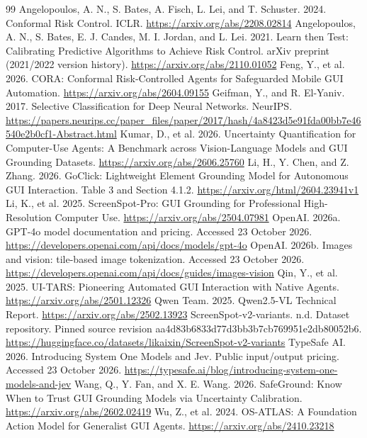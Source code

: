 \documentclass[10pt]{article}
\begin{document}
\begin{thebibliography}{99}
 Angelopoulos, A. N., S. Bates, A. Fisch, L. Lei, and T. Schuster. 2024. Conformal Risk Control. ICLR. \url{https://arxiv.org/abs/2208.02814}
 Angelopoulos, A. N., S. Bates, E. J. Candes, M. I. Jordan, and L. Lei. 2021. Learn then Test: Calibrating Predictive Algorithms to Achieve Risk Control. arXiv preprint (2021/2022 version history). \url{https://arxiv.org/abs/2110.01052}
 Feng, Y., et al. 2026. CORA: Conformal Risk-Controlled Agents for Safeguarded Mobile GUI Automation. \url{https://arxiv.org/abs/2604.09155}
 Geifman, Y., and R. El-Yaniv. 2017. Selective Classification for Deep Neural Networks. NeurIPS. \url{https://papers.neurips.cc/paper_files/paper/2017/hash/4a8423d5e91fda00bb7e46540e2b0cf1-Abstract.html}
 Kumar, D., et al. 2026. Uncertainty Quantification for Computer-Use Agents: A Benchmark across Vision-Language Models and GUI Grounding Datasets. \url{https://arxiv.org/abs/2606.25760}
 Li, H., Y. Chen, and Z. Zhang. 2026. GoClick: Lightweight Element Grounding Model for Autonomous GUI Interaction. Table 3 and Section 4.1.2. \url{https://arxiv.org/html/2604.23941v1}
 Li, K., et al. 2025. ScreenSpot-Pro: GUI Grounding for Professional High-Resolution Computer Use. \url{https://arxiv.org/abs/2504.07981}
 OpenAI. 2026a. GPT-4o model documentation and pricing. Accessed 23 October 2026. \url{https://developers.openai.com/api/docs/models/gpt-4o}
 OpenAI. 2026b. Images and vision: tile-based image tokenization. Accessed 23 October 2026. \url{https://developers.openai.com/api/docs/guides/images-vision}
 Qin, Y., et al. 2025. UI-TARS: Pioneering Automated GUI Interaction with Native Agents. \url{https://arxiv.org/abs/2501.12326}
 Qwen Team. 2025. Qwen2.5-VL Technical Report. \url{https://arxiv.org/abs/2502.13923}
 ScreenSpot-v2-variants. n.d. Dataset repository. Pinned source revision aa4d83b6833d77d3bb3b7cb769951e2db80052b6. \url{https://huggingface.co/datasets/likaixin/ScreenSpot-v2-variants}
 TypeSafe AI. 2026. Introducing System One Models and Jev. Public input/output pricing. Accessed 23 October 2026. \url{https://typesafe.ai/blog/introducing-system-one-models-and-jev}
 Wang, Q., Y. Fan, and X. E. Wang. 2026. SafeGround: Know When to Trust GUI Grounding Models via Uncertainty Calibration. \url{https://arxiv.org/abs/2602.02419}
 Wu, Z., et al. 2024. OS-ATLAS: A Foundation Action Model for Generalist GUI Agents. \url{https://arxiv.org/abs/2410.23218}
\end{thebibliography}
\clearpage
\end{document}
